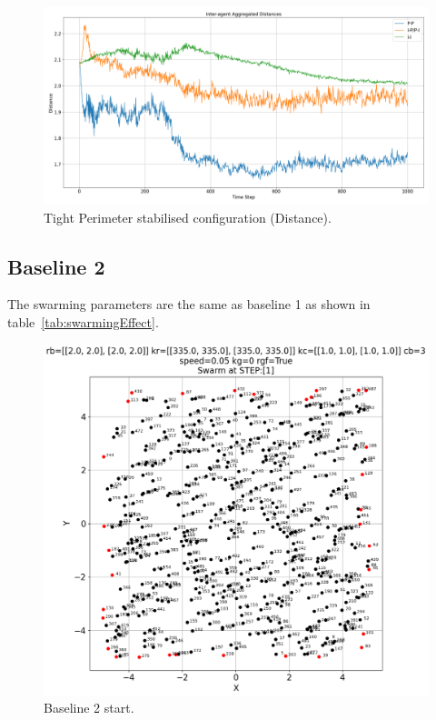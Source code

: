 \documentclass[12pt,a4paper]{IEEEtran}
\begin{document}
\begin{figure}[H]
	\begin{center}
		\includegraphics[width=1.0\linewidth]{figures/tightPerimDistance}
	\end{center}
	\caption{Tight Perimeter stabilised configuration (Distance). \label{fig:tightPerimDistance}}
\end{figure}


\subsection{Baseline 2}

The swarming parameters are the same as baseline 1 as shown in table~\ref{tab:swarmingEffect}.
\begin{figure}[H]
	\begin{center}
		\includegraphics[width=1.0\linewidth]{figures/baseline2-1}
	\end{center}
	\caption{Baseline 2 start. \label{fig:baseline2}}
\end{figure}
\end{document}
